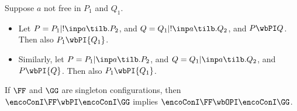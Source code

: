 \begin{lemma}
\label{l:deco}
Suppose  $a$ not free in $P_1 $ and $Q_1$. 
\begin{itemize}
\item
Let $P = P_1 | ! \inp a {\tilb}.P_2$, 
and $Q = Q_1 | ! \inp a {\tilb}.Q_2$, 
and  $ P \wbPI  Q$.
Then also 
  $ {P_1}  \wbPI  {Q_1}$.


\item 
Similarly, let $P = P_1 |  \inp a {\tilb}.P_2$, 
and $Q = Q_1 |  \inp a {\tilb}.Q_2$, 
and  $ {P} \wbPI  {Q}$.
Then also 
  $ {P_1}  \wbPI  {Q_1}$.
\end{itemize}
\end{lemma} 

\begin{theorem}
\label{t:opBIS_BIS}
If $\FF$ and $\GG$ are singleton configurations, then
$\encoConI  \FF \wbPI \encoConI  \GG $  implies 
 $\encoConI  \FF \wbOPI \encoConI  \GG $.
\end{theorem} 

